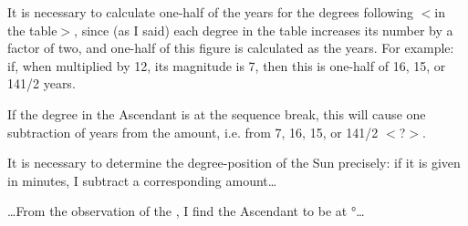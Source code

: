 It is necessary to calculate one-half of the years for the degrees following $<$in the table$>$, since (as I said) each degree in the table increases its number by a factor of two, and one-half of this figure is calculated as the years. For example: if, when multiplied by 12, its magnitude is 7, then this is one-half of 16, 15, or 141/2 years. 

If the degree in the Ascendant is at the sequence break, this will cause one subtraction of years from the amount, i.e. from 7, 16, 15, or 141/2 $<$?$>$.

It is necessary to determine the degree-position of the Sun precisely: if it is given in minutes, I subtract a corresponding amount…

…From the observation of the \Sun, I find the Ascendant to be at °…

\newpage